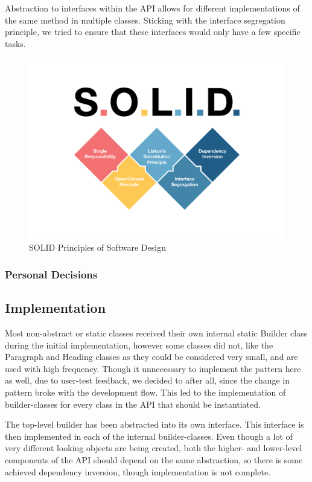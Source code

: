\documentclass[12pt]{article}
\begin{document}
        Abstraction to interfaces within the API allows for different implementations of the same method in multiple classes. Sticking with the interface segregation principle, we tried to ensure that these interfaces would only have a few specific tasks. 

        \begin{figure}[H]
            \centering
            \includegraphics[scale=0.5]{images/solidGraphic.png}
            \caption{SOLID Principles of Software Design}
        \end{figure}

        \subsubsection{Personal Decisions}
    
        \subsection{Implementation}

        Most non-abstract or static classes received their own internal static Builder class during the initial implementation, however some classes did not, like the Paragraph and Heading classes as they could be considered very small, and are used with high frequency. Though it unnecessary to implement the pattern here as well, due to user-test feedback, we decided to after all, since the change in pattern broke with the development flow. This led to the implementation of builder-classes for every class in the API that should be instantiated.
        
        The top-level builder has been abstracted into its own interface. This interface is then implemented in each of the internal builder-classes. Even though a lot of very different looking objects are being created, both the higher- and lower-level components of the API should depend on the same abstraction, so there is some achieved dependency inversion, though implementation is not complete.
\end{document}

